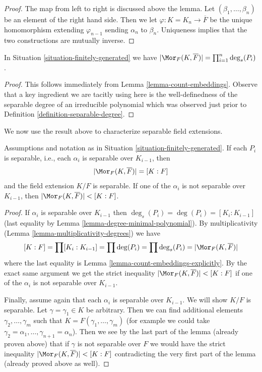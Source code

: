 \begin{proof}
The map from left to right is discussed above the lemma.
Let $(\beta_1, \ldots, \beta_n)$ be an element of the right hand side.
Then we let $\varphi : K = K_n \to \overline{F}$ be the unique homomorphism
extending $\varphi_{n - 1}$ sending $\alpha_n$ to $\beta_n$.
Uniqueness implies that the two constructions are mutually inverse.
\end{proof}

\begin{lemma}
\label{lemma-count-embeddings-explicitly}
In Situation \ref{situation-finitely-generated} we have
$|\Mor_F(K, \overline{F})| = \prod_{i = 1}^n \deg_s(P_i)$.
\end{lemma}

\begin{proof}
This follows immediately from Lemma \ref{lemma-count-embeddings}.
Observe that a key ingredient we are tacitly using here is the
well-definedness of the separable degree of an irreducible polynomial
which was observed just prior to
Definition \ref{definition-separable-degree}.
\end{proof}

\noindent
We now use the result above to characterize separable field extensions.

\begin{lemma}
\label{lemma-separably-generated-separable}
Assumptions and notation as in Situation \ref{situation-finitely-generated}.
If each $P_i$ is separable, i.e., each $\alpha_i$ is separable over
$K_{i - 1}$, then
$$
|\Mor_F(K, \overline{F})| = [K : F]
$$
and the field extension $K/F$ is separable. If one of the $\alpha_i$ is
not separable over $K_{i - 1}$, then
$|\Mor_F(K, \overline{F})| < [K : F]$.
\end{lemma}

\begin{proof}
If $\alpha_i$ is separable over $K_{i - 1}$ then
$\deg_s(P_i) = \deg(P_i) = [K_i : K_{i - 1}]$
(last equality by Lemma \ref{lemma-degree-minimal-polynomial}).
By multiplicativity (Lemma \ref{lemma-multiplicativity-degrees}) we have
$$
[K : F] = \prod [K_i : K_{i - 1}] = \prod \deg(P_i) =
\prod \deg_s(P_i) = |\Mor_F(K, \overline{F})|
$$
where the last equality is Lemma \ref{lemma-count-embeddings-explicitly}.
By the exact same argument we get the strict inequality
$|\Mor_F(K, \overline{F})| < [K : F]$ if one of the $\alpha_i$ is
not separable over $K_{i - 1}$.

\medskip\noindent
Finally, assume again that each $\alpha_i$ is separable over $K_{i - 1}$.
We will show $K/F$ is separable.
Let $\gamma = \gamma_1 \in K$ be arbitrary. Then we can find additional
elements $\gamma_2, \ldots, \gamma_m$ such that
$K = F(\gamma_1, \ldots, \gamma_m)$ (for example we could take
$\gamma_2 = \alpha_1, \ldots, \gamma_{n + 1} = \alpha_n$).
Then we see by the last part of the lemma (already proven above)
that if $\gamma$ is not separable over $F$ we would have the
strict inequality $|\Mor_F(K, \overline{F})| < [K : F]$
contradicting the very first part of the lemma (already proved above
as well).
\end{proof}

